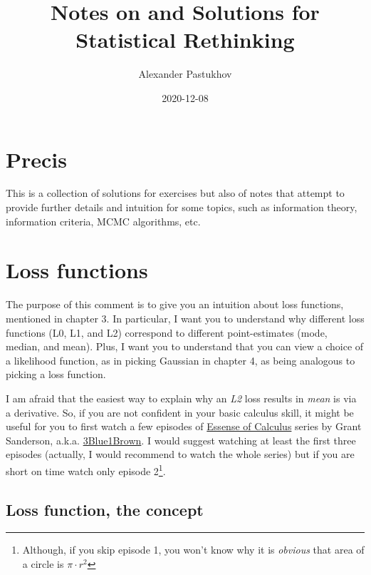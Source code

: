 \documentclass[
]{book}
\title{Notes on and Solutions for Statistical Rethinking}
\author{Alexander Pastukhov}
\date{2020-12-08}
\begin{document}
\maketitle

{
\setcounter{tocdepth}{1}
\tableofcontents
}
\hypertarget{precis}{%
\chapter{Precis}\label{precis}}

This is a collection of solutions for exercises but also of notes that attempt to provide further details and intuition for some topics, such as information theory, information criteria, MCMC algorithms, etc.

\hypertarget{loss-functions}{%
\chapter{Loss functions}\label{loss-functions}}

The purpose of this comment is to give you an intuition about loss functions, mentioned in chapter 3. In particular, I want you to understand why different loss functions (L0, L1, and L2) correspond to different point-estimates (mode, median, and mean). Plus, I want you to understand that you can view a choice of a likelihood function, as in picking Gaussian in chapter 4, as being analogous to picking a loss function.

I am afraid that the easiest way to explain why an \emph{L2} loss results in \emph{mean} is via a derivative. So, if you are not confident in your basic calculus skill, it might be useful for you to first watch a few episodes of \href{https://www.youtube.com/playlist?list=PLZHQObOWTQDMsr9K-rj53DwVRMYO3t5Yr}{Essense of Calculus} series by Grant Sanderson, a.k.a. \href{https://www.3blue1brown.com/}{3Blue1Brown}. I would suggest watching at least the first three episodes (actually, I would recommend to watch the whole series) but if you are short on time watch only episode 2\footnote{Although, if you skip episode 1, you won't know why it is \emph{obvious} that area of a circle is \(\pi\cdot r^2\)}.

\hypertarget{loss-function-the-concept}{%
\section{Loss function, the concept}\label{loss-function-the-concept}}
\end{document}
